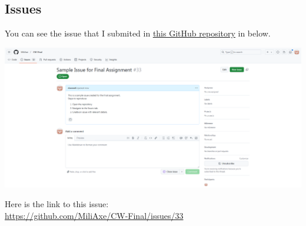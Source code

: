 \documentclass[titlepage]{article}
\begin{document}
\subsection{Issues}
You can see the issue that I submited in \href{https://github.com/MiliAxe/CW-Final}{\underline{this GitHub repository}} in below. 
\begin{tcolorbox}[picframe]
\centering
\includegraphics[width=\linewidth]{IssueScreenshot.png}
\end{tcolorbox}
\noindent Here is the link to this issue:
\\\url{https://github.com/MiliAxe/CW-Final/issues/33}
\end{document}
